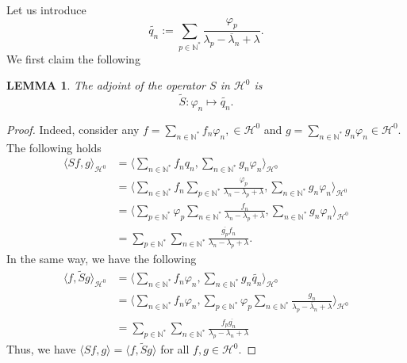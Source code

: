 \documentclass[11pt, dvipsnames]{amsart}
\newtheorem{lem}[theorem]{LEMMA}
\begin{document}
Let us introduce
\begin{equation}
\label{q_n_tilde}
\widetilde{q_n}:=\sum_{p\in \mathbb{N}^*}\frac{\varphi_p}{\overline{\lambda_p-\lambda_n+\lambda}}.
\end{equation}
We first claim the following
 \begin{lem}
 \label{lem:adjoint}
  The adjoint of the operator $S$ in $\mathcal{H}^0$ is 
  \begin{equation}
\tilde S: \varphi_n \mapsto \widetilde{q_n}.
\end{equation}

 \end{lem}
 \begin{proof}
    Indeed, consider any $f=\displaystyle\sum_{n\in \mathbb{N^*}}f_n\varphi_n,\in \mathcal{H}^0$ and $g=\displaystyle\sum_{n\in \mathbb{N^*}}g_n\varphi_n\in \mathcal{H}^0.$ The following holds
 \begin{align*}
     \langle Sf,g\rangle_{\mathcal{H}^0}
     &=\langle\sum_{n\in \mathbb{N^*}}f_n q_n, \sum_{n\in \mathbb{N^*}}g_n\varphi_n\rangle_{\mathcal{H}^0}\\
     &=\langle \sum_{n\in \mathbb{N^*}}f_n \sum_{p\in \mathbb{N}^*}\frac{\varphi_p}{\lambda_n-\lambda_p+\lambda}, \sum_{n\in \mathbb{N^*}}g_n\varphi_n\rangle_{\mathcal{H}^0}\\
     &=\langle\sum_{p\in \mathbb{N^*}}\varphi_p  \sum_{n\in \mathbb{N}^*}\frac{f_n}{\lambda_n-\lambda_p+\lambda}, \sum_{n\in \mathbb{N^*}} g_n\varphi_n\rangle_{\mathcal{H}^0}\\
     &=\sum_{p\in \mathbb{N^*}}\sum_{n\in \mathbb{N}^*}\frac{\overline{g_{p}} f_n}{\lambda_n-\lambda_p+\lambda}.
 \end{align*}
 In the same way, we have the following
 \begin{align*}
 \langle f,\tilde Sg\rangle_{\mathcal{H}^0}
             &=\langle\sum_{n\in \mathbb{N}^*}f_n \varphi_n, \sum_{n\in \mathbb{N}^*}g_n\widetilde{q_n}\rangle_{\mathcal{H}^0}\\
             &=\langle\sum_{n\in \mathbb{N^*}}f_n\varphi_n , \sum_{p\in \mathbb{N^*}} \varphi_p\sum_{n\in \mathbb{N}^*}\frac{g_n}{\overline{\lambda_p-\lambda_n+\lambda}}\rangle_{\mathcal{H}^0}\\
            &=\sum_{p\in \mathbb{N^*}} \sum_{n\in \mathbb{N}^*}\frac{f_p\overline{g_{n}}}{\lambda_p-\lambda_n+\lambda}
 \end{align*}
 Thus, we have $\langle Sf,g\rangle=\langle f,\tilde Sg\rangle$ for all $f,g\in {\mathcal{H}^0}.$ 
 \end{proof}
\end{document}
